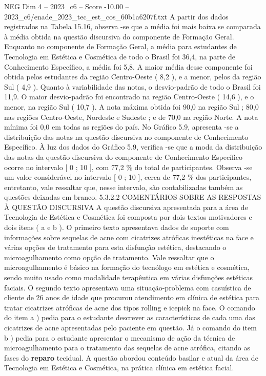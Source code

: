 \begin{textsample}{NEG Dim 4 – 2023\_c6 – Score -10.00 – 2023\_c6/enade\_2023\_tec\_est\_cos\_60b1a6207f.txt}
A partir dos dados registrados na Tabela 15.16, observa -se que a média foi mais baixa se comparada à média obtida na questão discursiva do componente de Formação Geral.
Enquanto no componente de Formação Geral, a média para estudantes de Tecnologia em Estética e Cosmética de todo o Brasil foi 36,4, na parte de Conhecimento Específico, a média foi 5,8.
A maior média desse componente foi obtida pelos estudantes da região Centro-Oeste ( 8,2 ), e a menor, pelos da região Sul ( 4,9 ).
Quanto à variabilidade das notas, o desvio-padrão de todo o Brasil foi 11,9.
O maior desvio-padrão foi encontrado na região Centro-Oeste ( 14,6 ), e o menor, na região Sul ( 10,7 ).
A nota máxima obtida foi 90,0 na região Sul ; 80,0 nas regiões Centro-Oeste, Nordeste e Sudeste ; e de 70,0 na região Norte.
A nota mínima foi 0,0 em todas as regiões do país.
No Gráfico 5.9, apresenta -se a distribuição das notas na questão discursiva no componente de Conhecimento Específico.
À luz dos dados do Gráfico 5.9, verifica -se que a moda da distribuição das notas da questão discursiva do componente de Conhecimento Específico ocorre no intervalo [ 0 ; 10 ], com 77,2 \% do total de participantes.
Observa -se um valor considerável no intervalo [ 0 ; 10 ], cerca de 77,2 \% dos participantes, entretanto, vale ressaltar que, nesse intervalo, são contabilizadas também as questões deixadas em branco. 5.3.2.2 COMENTÁRIOS SOBRE AS RESPOSTAS À QUESTÃO DISCURSIVA A questão discursiva apresentada para a área de Tecnologia de Estética e Cosmética foi composta por dois textos motivadores e dois itens ( a e b ).
O primeiro texto apresentava dados de suporte com informações sobre sequelas de acne com cicatrizes atróficas inestéticas na face e várias opções de tratamento para esta disfunção estética, destacando o microagulhamento como opção de tratamento.
Vale ressaltar que o microagulhamento é básico na formação do tecnólogo em estética e cosmética, sendo muito usado como modalidade terapêutica em várias disfunções estéticas faciais.
O segundo texto apresentava uma situação-problema com casuística de cliente de 26 anos de idade que procurou atendimento em clínica de estética para tratar cicatrizes atróficas de acne dos tipos rolling e icepick na face.
O comando do item a ) pedia para o estudante descrever as características de cada uma das cicatrizes de acne apresentadas pelo paciente em questão.
Já o comando do item b ) pedia para o estudante apresentar o mecanismo de ação da técnica de microagulhamento para o tratamento das sequelas de acne atrófica, citando as fases do \textbf{reparo} tecidual.
A questão abordou conteúdo basilar e atual da área de Tecnologia em Estética e Cosmética, na prática clínica em estética facial.

\end{textsample}

